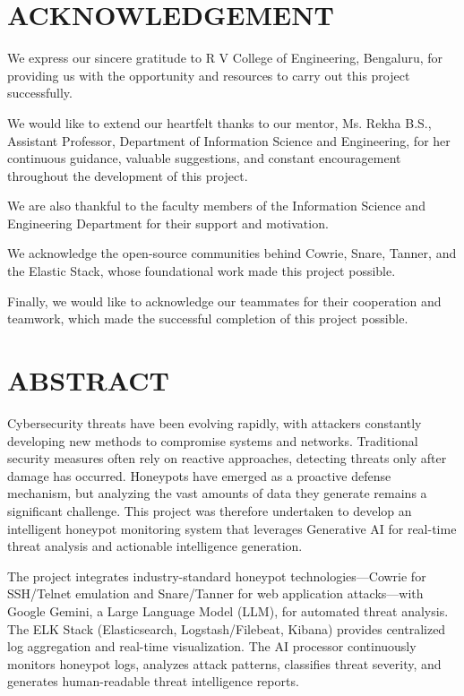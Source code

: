\documentclass[12pt,a4paper]{report}
\begin{document}
\newpage

\chapter*{ACKNOWLEDGEMENT}

We express our sincere gratitude to R V College of Engineering, Bengaluru, for providing us with the opportunity and resources to carry out this project successfully.

We would like to extend our heartfelt thanks to our mentor, Ms. Rekha B.S., Assistant Professor, Department of Information Science and Engineering, for her continuous guidance, valuable suggestions, and constant encouragement throughout the development of this project.

We are also thankful to the faculty members of the Information Science and Engineering Department for their support and motivation.

We acknowledge the open-source communities behind Cowrie, Snare, Tanner, and the Elastic Stack, whose foundational work made this project possible.

Finally, we would like to acknowledge our teammates for their cooperation and teamwork, which made the successful completion of this project possible.

\newpage

\chapter*{ABSTRACT}

Cybersecurity threats have been evolving rapidly, with attackers constantly developing new methods to compromise systems and networks. Traditional security measures often rely on reactive approaches, detecting threats only after damage has occurred. Honeypots have emerged as a proactive defense mechanism, but analyzing the vast amounts of data they generate remains a significant challenge. This project was therefore undertaken to develop an intelligent honeypot monitoring system that leverages Generative AI for real-time threat analysis and actionable intelligence generation.

The project integrates industry-standard honeypot technologies—Cowrie for SSH/Telnet emulation and Snare/Tanner for web application attacks—with Google Gemini, a Large Language Model (LLM), for automated threat analysis. The ELK Stack (Elasticsearch, Logstash/Filebeat, Kibana) provides centralized log aggregation and real-time visualization. The AI processor continuously monitors honeypot logs, analyzes attack patterns, classifies threat severity, and generates human-readable threat intelligence reports.
\end{document}
